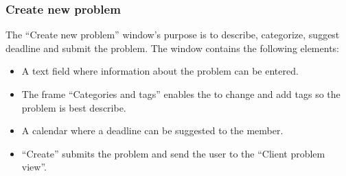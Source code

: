 \subsubsection{Create new problem}
The ``Create new problem'' window's purpose is to describe, categorize, suggest deadline and submit the problem. The window contains the following elements:
\begin{itemize}
	\item A text field where information about the problem can be entered.
	\item The frame ``Categories and tags'' enables the \aclient[] to change and add tags so the problem is best describe.
	\item A calendar where a deadline can be suggested to the \astaff[] member.
	\item ``Create'' submits the problem and send the user to the ``Client problem view''.
\end{itemize}







